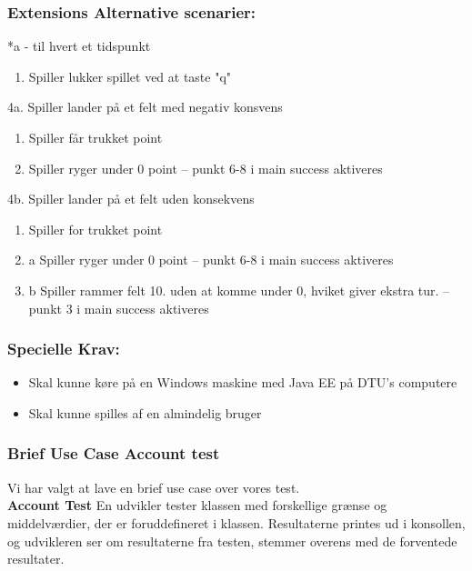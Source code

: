 \subsubsection*{Extensions Alternative scenarier:}
*a - til hvert et tidspunkt
\begin{enumerate}
\item Spiller lukker spillet ved at taste "q"
\end{enumerate}
4a. Spiller lander på et felt med negativ konsvens
\begin{enumerate}
\item Spiller får trukket point
\item Spiller ryger under 0 point
-- punkt 6-8 i main success aktiveres
\end{enumerate}
4b. Spiller lander på et felt uden konsekvens
\begin{enumerate}
\item Spiller for trukket point
\item a Spiller ryger under 0 point
-- punkt 6-8 i main success aktiveres
\item b Spiller rammer felt 10. uden at komme under 0, hviket giver ekstra tur. 
-- punkt 3 i main success aktiveres
\end{enumerate}
\subsubsection*{Specielle Krav:}
\begin{itemize}
\item Skal kunne køre på en Windows maskine med Java EE på DTU's computere
\item Skal kunne spilles af en almindelig bruger
\end{itemize}
\subsubsection{Brief Use Case Account test}
Vi har valgt at lave en brief use case over vores test.
\\

\textbf{Account Test}
En udvikler tester klassen med forskellige grænse og middelværdier, der er foruddefineret i klassen. Resultaterne printes ud i konsollen, og udvikleren ser om resultaterne fra testen, stemmer overens med de forventede resultater.